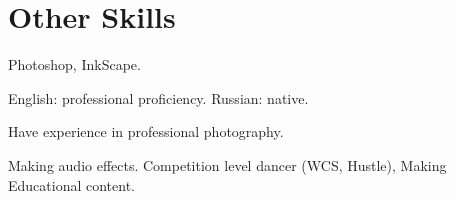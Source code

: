 \documentclass{article}
\begin{document}
\section{Other Skills}
\begin{description}[widest=Langauges]
\item[Software]  Photoshop, InkScape.
\item[Languages] English: professional proficiency.  Russian: native.
\item[Photography] Have experience in professional photography.
\item[Hobbies] Making audio effects. Competition level dancer (WCS, Hustle), Making Educational content.
\end{description}
 
\end{document}
